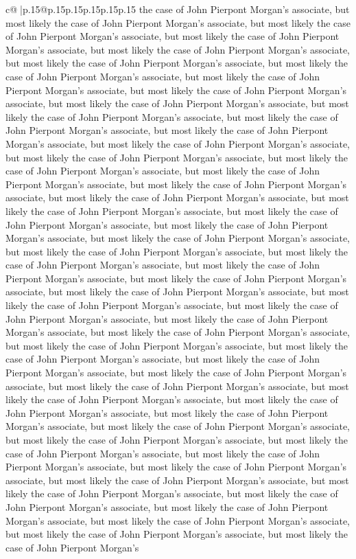\documentclass{article}
\begin{document}
{\begin{supertabular}{c@{$\;$}|p{.15\linewidth}@{}p{.15\linewidth}p{.15\linewidth}p{.15\linewidth}p{.15\linewidth}p{.15\linewidth}}
{{{the case of John Pierpont Morgan's associate, but most likely the case of John Pierpont Morgan's associate, but most likely the case of John Pierpont Morgan's associate, but most likely the case of John Pierpont Morgan's associate, but most likely the case of John Pierpont Morgan's associate, but most likely the case of John Pierpont Morgan's associate, but most likely the case of John Pierpont Morgan's associate, but most likely the case of John Pierpont Morgan's associate, but most likely the case of John Pierpont Morgan's associate, but most likely the case of John Pierpont Morgan's associate, but most likely the case of John Pierpont Morgan's associate, but most likely the case of John Pierpont Morgan's associate, but most likely the case of John Pierpont Morgan's associate, but most likely the case of John Pierpont Morgan's associate, but most likely the case of John Pierpont Morgan's associate, but most likely the case of John Pierpont Morgan's associate, but most likely the case of John Pierpont Morgan's associate, but most likely the case of John Pierpont Morgan's associate, but most likely the case of John Pierpont Morgan's associate, but most likely the case of John Pierpont Morgan's associate, but most likely the case of John Pierpont Morgan's associate, but most likely the case of John Pierpont Morgan's associate, but most likely the case of John Pierpont Morgan's associate, but most likely the case of John Pierpont Morgan's associate, but most likely the case of John Pierpont Morgan's associate, but most likely the case of John Pierpont Morgan's associate, but most likely the case of John Pierpont Morgan's associate, but most likely the case of John Pierpont Morgan's associate, but most likely the case of John Pierpont Morgan's associate, but most likely the case of John Pierpont Morgan's associate, but most likely the case of John Pierpont Morgan's associate, but most likely the case of John Pierpont Morgan's associate, but most likely the case of John Pierpont Morgan's associate, but most likely the case of John Pierpont Morgan's associate, but most likely the case of John Pierpont Morgan's associate, but most likely the case of John Pierpont Morgan's associate, but most likely the case of John Pierpont Morgan's associate, but most likely the case of John Pierpont Morgan's associate, but most likely the case of John Pierpont Morgan's associate, but most likely the case of John Pierpont Morgan's associate, but most likely the case of John Pierpont Morgan's associate, but most likely the case of John Pierpont Morgan's associate, but most likely the case of John Pierpont Morgan's associate, but most likely the case of John Pierpont Morgan's associate, but most likely the case of John Pierpont Morgan's associate, but most likely the case of John Pierpont Morgan's associate, but most likely the case of John Pierpont Morgan's associate, but most likely the case of John Pierpont Morgan's associate, but most likely the case of John Pierpont Morgan's associate, but most likely the case of John Pierpont Morgan's associate, but most likely the case of John Pierpont Morgan's associate, but most likely the case of John Pierpont Morgan's }}}
\end{supertabular}}
\end{document}

